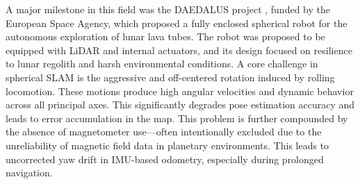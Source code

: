 \documentclass[english, bachelor, utf8]{base/thesis_telematics}
\begin{document}
A major milestone in this field was the DAEDALUS project \cite{DAEDALUS}, funded by the European Space Agency, which proposed a fully enclosed spherical robot for the autonomous exploration of lunar lava tubes. 
The robot was proposed to be equipped with LiDAR and internal actuators, and its design focused on resilience to lunar regolith and harsh environmental conditions.
A core challenge in spherical SLAM is the aggressive and off-centered rotation induced by rolling locomotion. 
These motions produce high angular velocities and dynamic behavior across all principal axes. 
This significantly degrades pose estimation accuracy and leads to error accumulation in the map. 
This problem is further compounded by the absence of magnetometer use—often intentionally excluded due to the unreliability of magnetic field data in planetary environments.
This leads to uncorrected yaw drift in IMU-based odometry, especially during prolonged navigation.
\end{document}
